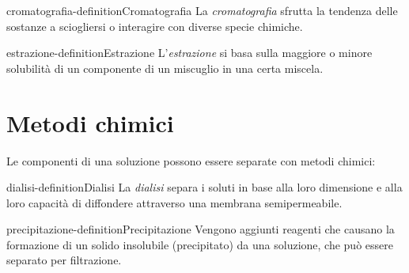 \documentclass[preview]{standalone}
\begin{document}
\begin{snippetdefinition}{cromatografia-definition}{Cromatografia}
    La \textit{cromatografia} sfrutta la tendenza delle sostanze a sciogliersi o interagire
    con diverse specie chimiche.
\end{snippetdefinition}

\begin{snippetdefinition}{estrazione-definition}{Estrazione}
    L'\textit{estrazione} si basa sulla maggiore o minore solubilità di un componente di un miscuglio in una certa miscela.
\end{snippetdefinition}

\section{Metodi chimici}

\begin{plainhtml}
    Le componenti di una soluzione possono essere separate con metodi chimici:
\end{plainhtml}

\begin{snippetdefinition}{dialisi-definition}{Dialisi}
    La \textit{dialisi} separa i soluti in base alla loro dimensione e alla loro capacità di diffondere attraverso una
    membrana semipermeabile.
\end{snippetdefinition}

\begin{snippetdefinition}{precipitazione-definition}{Precipitazione}
    Vengono aggiunti reagenti che causano la formazione di un solido insolubile (precipitato)
    da una soluzione, che può essere separato per filtrazione.
\end{snippetdefinition}
\end{document}
